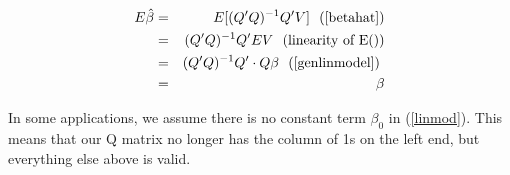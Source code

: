 \begin{eqnarray}
E\hat{\beta} &=& E[(Q'Q)^{-1} Q'V] ~ \textrm{  (\ref{betahat})} \\
&=& (Q'Q)^{-1} Q'EV ~ \textrm{  (linearity of E())} \\
&=& (Q'Q)^{-1} Q'\cdot Q\beta ~ \textrm{  (\ref{genlinmodel}) } \\
&=& \beta
\end{eqnarray}

In some applications, we assume there is no constant term $\beta_0$ 
in (\ref{linmod}).  This means that our Q matrix no longer has the
column of 1s on the left end, but everything else above is valid.

% 
% 
% 
% 
% 
% 
% 
% 
% 
% 
